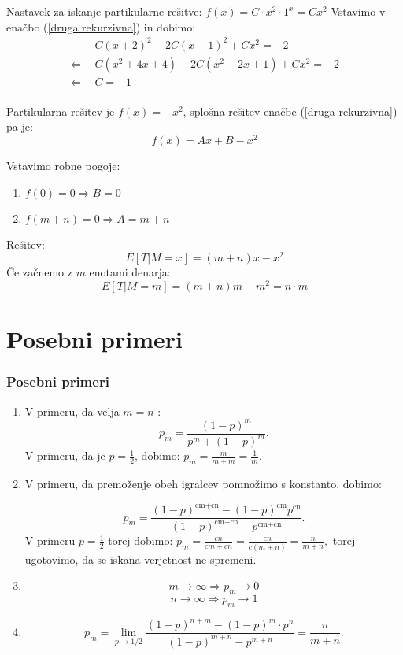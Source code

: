 \documentclass[10pt]{beamer}
\begin{document}
\begin{frame}
Nastavek za iskanje partikularne rešitve: $f(x)=C\cdot x^2\cdot 1^x= Cx^2$
 Vstavimo v enačbo (\ref{druga rekurzivna}) in dobimo:
\begin{equation*}
\begin{split}
 & ~~C(x+2)^2-2C(x+1)^2+Cx^2=-2\\
\Leftarrow & ~~C(x^2+4x+4)-2C(x^2+2x+1)+Cx^2=-2\\
\Leftarrow &  ~~C = -1 \\
\end{split}
\end{equation*}

Partikularna rešitev je $f(x)=-x^2$, splošna rešitev enačbe (\ref{druga rekurzivna}) pa je: $$f(x)=Ax+B-x^2$$

Vstavimo robne pogoje:
\begin{enumerate}
\item $f(0)=0\Rightarrow B = 0$
\item $f(m+n)=0 \Rightarrow A = m+n$
\end{enumerate}
Rešitev: $$E[T|M=x]= (m+n)x-x^2$$
Če začnemo z $m$ enotami denarja:$$E[T|M=m]=(m+n)m-m^2= n\cdot m$$
\end{frame}


\section[Posebni primeri]{Posebni primeri}
\begin{frame}
\frametitle{Posebni primeri}
\begin{enumerate}
\item V primeru, da velja $m = n$ : $$p_m = \frac{(1-p)^m}{p^m+(1-p)^m}.$$
V primeru, da je $p = \frac{1}{2}$, dobimo: 
$p_m = \frac{m}{m + m} = \frac{1}{m}.$
\item V primeru, da premoženje obeh igralcev pomnožimo s konstanto, dobimo:

$$p_m = \frac{(1-p)^{\text{cm}+\text{cn}}-(1-p)^{\text{cm}} p^{\text{cn}}}{(1-p)^{\text{cm}+\text{cn}}-p^{\text{cm}+\text{cn}}}.$$
V primeru $p = \frac{1}{2}$ torej dobimo: 
$p_m = \frac{cn}{cm + cn} = \frac{cn}{c(m + n)} = \frac{n}{m + n},$ torej ugotovimo, da se iskana verjetnost ne spremeni. 

\item $$m \to \infty  \Rightarrow p_m \to 0$$
$$n \to \infty  \Rightarrow p_m \to 1$$

\item $$p_m = \lim_{p \to 1/2}  \frac{(1-p)^{n+m} - (1-p)^m \cdot p^n}{(1-p)^{m+n} - p^{m+n}}  =\frac{n}{m + n}.$$
\end{enumerate}
\end{frame}
\end{document}
